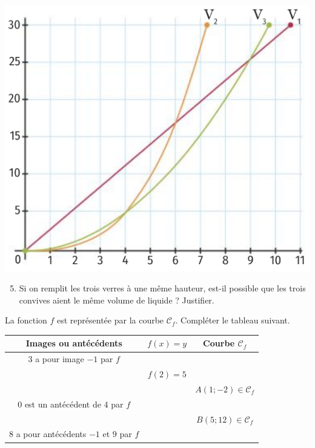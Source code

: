 \documentclass[11pt]{article}
\begin{document}
\begin{exo}
\begin{minipage}{.35\textwidth}
\includegraphics[scale=.3]{graph-verres.png}
\end{minipage}
\begin{enumerate}
    \setcounter{enumi}{4}
  \item Si on remplit les trois verres à une même hauteur, est-il possible que
    les trois convives aient le même volume de liquide ? Justifier.
\end{enumerate}
\end{exo}

\begin{exo}
La fonction $f$ est représentée par la courbe
$\mathscr{C}_f$. Compléter le tableau suivant.
\begin{center}
  \def\arraystretch{2}
  \begin{tabular}{|c|c|c|}
    \hline
    \textbf{Images ou antécédents} & $f(x)=y$ & \textbf{Courbe} $\mathscr C_f$\\
    \hline
    $3$ a pour image $-1$ par $f$ & & \\
    \hline
    & $f(2)=5$ & \\
    \hline
    & & $A(1;-2)\in\mathscr C_f$ \\
    \hline
    $0$ est un antécédent de $4$ par $f$ & & \\
    \hline
    & & $B(5;12)\in\mathscr C_f$ \\
    \hline
    $8$ a pour antécédents $-1$ et $9$ par $f$ & & \\
    \hline
  \end{tabular}
\end{center}
\end{exo}
\end{document}
